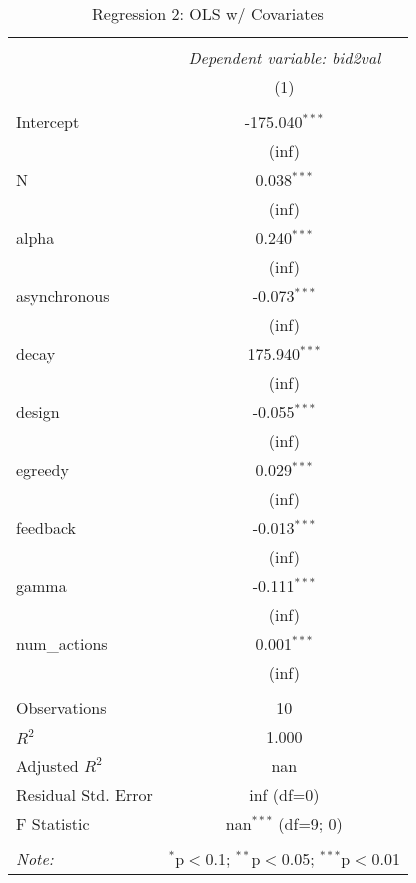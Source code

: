 \begin{table}[!htbp] \centering
  \caption{Regression 2: OLS w/ Covariates}
\begin{tabular}{@{\extracolsep{5pt}}lc}
\\[-1.8ex]\hline
\hline \\[-1.8ex]
& \multicolumn{1}{c}{\textit{Dependent variable: bid2val}} \
\cr \cline{2-2}
\\[-1.8ex] & (1) \\
\hline \\[-1.8ex]
 Intercept & -175.040$^{***}$ \\
& (inf) \\
 N & 0.038$^{***}$ \\
& (inf) \\
 alpha & 0.240$^{***}$ \\
& (inf) \\
 asynchronous & -0.073$^{***}$ \\
& (inf) \\
 decay & 175.940$^{***}$ \\
& (inf) \\
 design & -0.055$^{***}$ \\
& (inf) \\
 egreedy & 0.029$^{***}$ \\
& (inf) \\
 feedback & -0.013$^{***}$ \\
& (inf) \\
 gamma & -0.111$^{***}$ \\
& (inf) \\
 num_actions & 0.001$^{***}$ \\
& (inf) \\
\hline \\[-1.8ex]
 Observations & 10 \\
 $R^2$ & 1.000 \\
 Adjusted $R^2$ & nan \\
 Residual Std. Error & inf (df=0) \\
 F Statistic & nan$^{***}$ (df=9; 0) \\
\hline
\hline \\[-1.8ex]
\textit{Note:} & \multicolumn{1}{r}{$^{*}$p$<$0.1; $^{**}$p$<$0.05; $^{***}$p$<$0.01} \\
\end{tabular}
\end{table}
